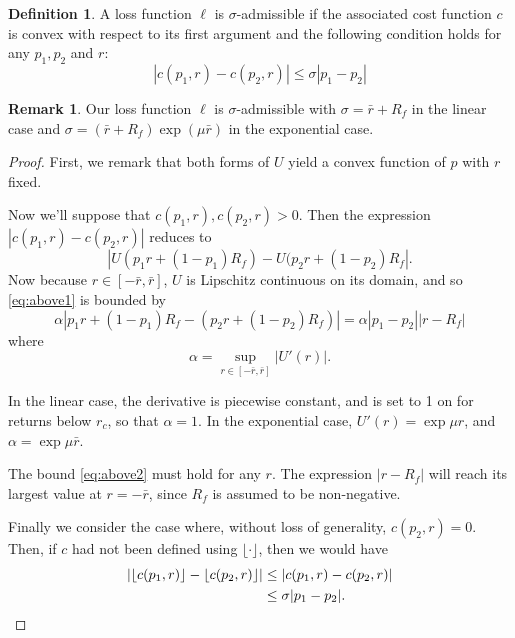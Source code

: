 \documentclass[11pt]{article}
\DeclarePairedDelimiter\floor{\lfloor}{\rfloor}
\theoremstyle{plain}
\theoremstyle{definition}
\newtheorem*{deff}{Definition}
\newtheorem*{rem}{Remark}
\begin{document}
\begin{deff}
  A loss function $\ell$ is $\sigma$-admissible if the associated cost function $c$ is
  convex with respect to its first argument and the following condition holds for any
  $p_1,p_2$ and $r$:
  \begin{equation}
    |c(p_1,r) - c(p_2,r)| \leq \sigma |p_1 - p_2|
  \end{equation}
\end{deff}

\begin{rem}
  Our loss function $\ell$ is $\sigma$-admissible with $\sigma=\bar r+R_f$ in the linear
  case and $\sigma=(\bar r+R_f)\exp(\mu\bar r)$ in the exponential case.
\end{rem}

\begin{proof}
  First, we remark that both forms of $U$ yield a convex function of $p$ with $r$ fixed. 

  Now we'll suppose that $c(p_1,r), c(p_2,r) > 0$. Then the expression
  $|c(p_1,r)-c(p_2,r)|$ reduces to
  \begin{equation}
    \label{eq:above1}
    |U(p_1r + (1-p_1)R_f) - U(p_2r + (1-p_2)R_f|.
  \end{equation}
  Now because $r\in[-\bar r,\bar r]$, $U$ is Lipschitz continuous on its domain, and so
  \eqref{eq:above1} is bounded by
  \begin{equation}
    \label{eq:above2}
    \alpha |p_1r + (1-p_1)R_f - (p_2r + (1-p_2)R_f)| = \alpha|p_1-p_2||r-R_f|
  \end{equation}
  where
  \begin{equation}
    \alpha = \sup_{r\in[-\bar r,\bar r]} |U'(r)|.
  \end{equation}

  In the linear case, the derivative is piecewise constant, and is set to 1 on for returns
  below $r_c$, so that $\alpha=1$. In the exponential case, $U'(r) = \exp\mu r$, and
  $\alpha = \exp \mu \bar r$.

  The bound \eqref{eq:above2} must hold for any $r$. The expression $|r-R_f|$ will reach
  its largest value at $r=-\bar r$, since $R_f$ is assumed to be non-negative.

  Finally we consider the case where, without loss of generality, $c(p_2,r)=0$. Then, if
  $c$ had not been defined using $\lfloor\cdot\rfloor$, then we would have
  \begin{align}
    |\floor*{c(p_1,r)} - \floor*{c(p_2,r)}| &\leq |c(p_1,r) - c(p_2,r)|\\
    &\leq \sigma|p_1-p_2|.\qedhere
  \end{align}
\end{proof}
\end{document}

